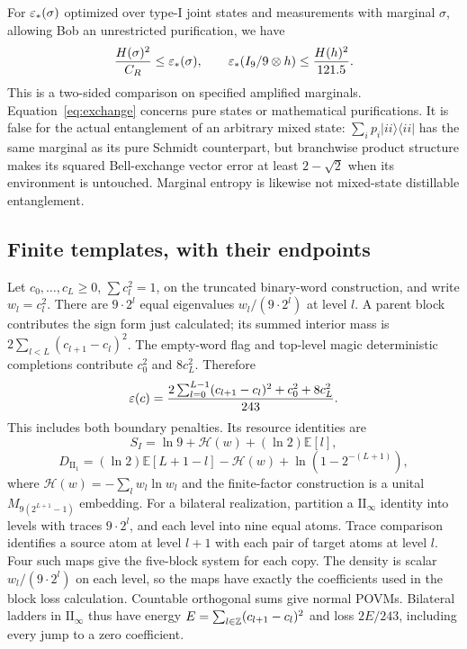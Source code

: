 For $\varepsilon_*(\sigma)$ optimized over type-I joint states and measurements with marginal $\sigma$, allowing Bob an unrestricted purification, we have
\[
 \frac{H(\sigma)^2}{C_R}\le\varepsilon_*(\sigma),\qquad
 \varepsilon_*(I_9/9\otimes h)\le\frac{H(h)^2}{121.5}.
\]
This is a two-sided comparison on specified amplified marginals. Equation~\eqref{eq:exchange} concerns pure states or mathematical purifications. It is false for the actual entanglement of an arbitrary mixed state: $\sum_ip_i|ii\rangle\langle ii|$ has the same marginal as its pure Schmidt counterpart, but branchwise product structure makes its squared Bell-exchange vector error at least $2-\sqrt2$ when its environment is untouched. Marginal entropy is likewise not mixed-state distillable entanglement.

\subsection{Finite templates, with their endpoints}
Let $c_0,\ldots,c_L\ge0$, $\sum c_l^2=1$, on the truncated binary-word construction, and write $w_l=c_l^2$. There are $9\cdot2^l$ equal eigenvalues $w_l/(9\cdot2^l)$ at level $l$. A parent block contributes the sign form just calculated; its summed interior mass is $2\sum_{l<L}(c_{l+1}-c_l)^2$. The empty-word flag and top-level magic deterministic completions contribute $c_0^2$ and $8c_L^2$. Therefore
\begin{equation}\label{eq:template}
 \varepsilon(c)=\frac{2\sum_{l=0}^{L-1}(c_{l+1}-c_l)^2+c_0^2+8c_L^2}{243}.
\end{equation}
This includes both boundary penalties. Its resource identities are
\[
 S_I=\ln9+\mathcal H(w)+(\ln2)\mathbb E[l],
\]
\[
 D_{\mathrm{II}_1}=(\ln2)\mathbb E[L+1-l]-\mathcal H(w)
                   +\ln(1-2^{-(L+1)}),
\]
where $\mathcal H(w)=-\sum_lw_l\ln w_l$ and the finite-factor construction is a unital $M_{9(2^{L+1}-1)}$ embedding. For a bilateral realization, partition a $\mathrm{II}_\infty$ identity into levels with traces $9\cdot2^l$, and each level into nine equal atoms. Trace comparison identifies a source atom at level $l+1$ with each pair of target atoms at level $l$. Four such maps give the five-block system for each copy. The density is scalar $w_l/(9\cdot2^l)$ on each level, so the maps have exactly the coefficients used in the block loss calculation. Countable orthogonal sums give normal POVMs. Bilateral ladders in $\mathrm{II}_\infty$ thus have energy $E=\sum_{l\in\mathbb Z}(c_{l+1}-c_l)^2$ and loss $2E/243$, including every jump to a zero coefficient.

